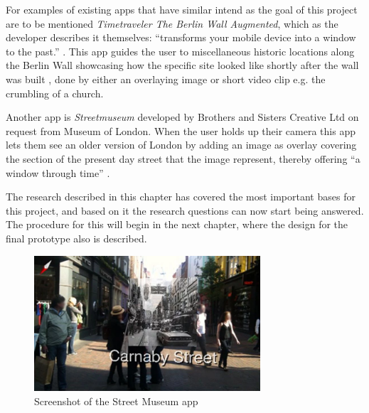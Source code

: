 For examples of existing apps that have similar intend as the goal of this project are to be mentioned \textit{Timetraveler The Berlin Wall Augmented}, which as the developer describes it themselves: “transforms your mobile device into a window to the past.” \cite{Hardenberg}. This app guides the user to miscellaneous historic locations along the Berlin Wall showcasing how the specific site looked like shortly after the wall was built \cite{Hardenberg}, done by either an overlaying image or short video clip e.g. the crumbling of a church.

Another app is \textit{Streetmuseum} developed by Brothers and Sisters Creative Ltd on request from Museum of London. When the user holds up their camera this app lets them see an older version of London by adding an image as overlay covering the section of the present day street that the image represent, thereby offering “a window through time” \cite{Brothers}.

The research described in this chapter has covered the most important bases for this project, and based on it the research questions can now start being answered. The procedure for this will begin in the next chapter, where the design for the final prototype also is described.

\begin{figure}[h!]
    \centering
    \includegraphics[width=0.75\textwidth]{figures/Streetmuseum.png}
    \caption{Screenshot of the Street Museum app \cite{Brothers}}\label{fig:streetmuseum}
\end{figure}


